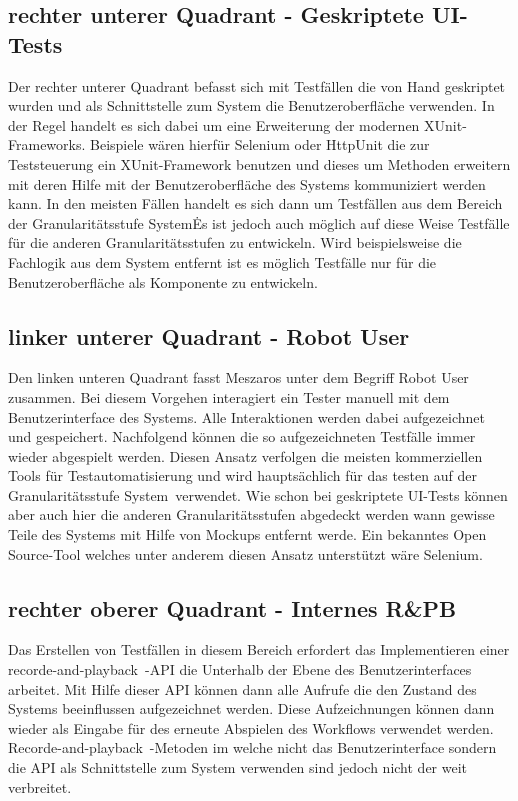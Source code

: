\subsection{rechter unterer Quadrant - Geskriptete UI-Tests}
Der rechter unterer Quadrant befasst sich mit Testfällen die von Hand geskriptet wurden und als Schnittstelle zum System die Benutzeroberfläche verwenden. In der Regel handelt es sich dabei um eine Erweiterung der modernen XUnit-Frameworks. Beispiele wären hierfür Selenium oder HttpUnit die zur Teststeuerung ein XUnit-Framework benutzen und dieses um Methoden erweitern mit deren Hilfe mit der Benutzeroberfläche des Systems kommuniziert werden kann. In den meisten Fällen handelt es sich dann um Testfällen aus dem Bereich der Granularitätsstufe \glqq System\grqq\. Es ist jedoch auch möglich auf diese Weise Testfälle für die anderen Granularitätsstufen zu entwickeln. Wird beispielsweise die Fachlogik aus dem System entfernt ist es möglich Testfälle nur für die Benutzeroberfläche als Komponente zu entwickeln.

\subsection{linker unterer Quadrant - Robot User}
Den linken unteren Quadrant fasst Meszaros unter dem Begriff \glqq Robot User\grqq\  \cite{meszaros_agile_2003} zusammen. Bei diesem Vorgehen interagiert ein Tester manuell mit dem Benutzerinterface des Systems. Alle Interaktionen werden dabei aufgezeichnet und gespeichert. Nachfolgend können die so aufgezeichneten Testfälle immer wieder abgespielt werden.
Diesen Ansatz verfolgen die meisten kommerziellen Tools für Testautomatisierung und wird hauptsächlich für das testen auf der Granularitätsstufe \glqq System\grqq\ verwendet.
Wie schon bei geskriptete UI-Tests können aber auch hier die anderen Granularitätsstufen abgedeckt werden wann gewisse Teile des Systems mit Hilfe von Mockups entfernt werde.
Ein bekanntes Open Source-Tool welches unter anderem diesen Ansatz unterstützt wäre Selenium.


\subsection{rechter oberer Quadrant - Internes R\&PB}
Das Erstellen von Testfällen in diesem Bereich erfordert das Implementieren einer \glqq recorde-and-playback\grqq\ -API die Unterhalb der Ebene des Benutzerinterfaces arbeitet. Mit Hilfe dieser API können dann alle Aufrufe die den Zustand des Systems beeinflussen aufgezeichnet werden. Diese Aufzeichnungen können dann wieder als Eingabe für des erneute Abspielen des Workflows verwendet werden.
\glqq Recorde-and-playback\grqq\ -Metoden im welche nicht das Benutzerinterface sondern die API als Schnittstelle zum System verwenden sind jedoch nicht der weit verbreitet.
